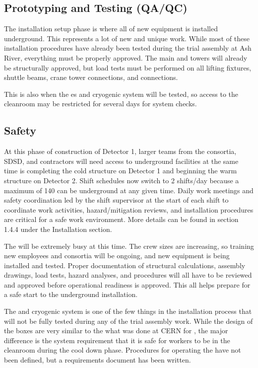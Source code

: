 \clearpage

\subsection{Prototyping and Testing (QA/QC)}
\label{sec:fdsp-tc-infr-qaqc}
The installation setup phase is where all of new equipment is installed underground. This represents a lot of new and unique work. While most of these installation procedures have already been tested during the trial assembly at Ash River, everything must be properly approved. The main  and  towers will already be structurally approved, but load tests must be performed on all lifting fixtures, shuttle beams, crane tower connections, and \coldbox connections. 

This is also when the \coldbox{}es and cryogenic system will be tested, so access to the cleanroom  may be restricted for several days for system checks.


\subsection{Safety}
\label{sec:fdsp-tc-infr-safety}
At this phase of construction of Detector 1, larger teams from the consortia, SDSD,  and contractors will need access to underground facilities at the same time  is completing the cold structure on Detector 1 and beginning the warm structure on Detector 2. Shift schedules now switch to 2 shifts/day because a maximum of 140  can be underground at any given time.  Daily work meetings and safety coordination led by the shift supervisor at the start of each shift to coordinate work activities, hazard/mitigation reviews, and installation procedures are critical for a safe work environment. More details can be found in section 1.4.4 under the Installation  section. 

The  will be extremely busy at this time. The crew sizes are increasing, so training new employees and consortia will be ongoing, and new equipment is being installed and tested. Proper documentation of structural calculations, assembly drawings, load tests, hazard analyses, and procedures will all have to be reviewed and approved before operational readiness is approved. This all helps prepare for a safe start to the underground installation. 

The \coldbox and cryogenic system is one of the few things in the installation process that will not be fully tested during any of the trial assembly work. While the design of the boxes are very similar to the what was done at CERN for , the major difference is the system requirement that it is safe for workers to be in the cleanroom during the cool down phase. Procedures for operating the \coldbox have not been defined, but a requirements document has been written.   

